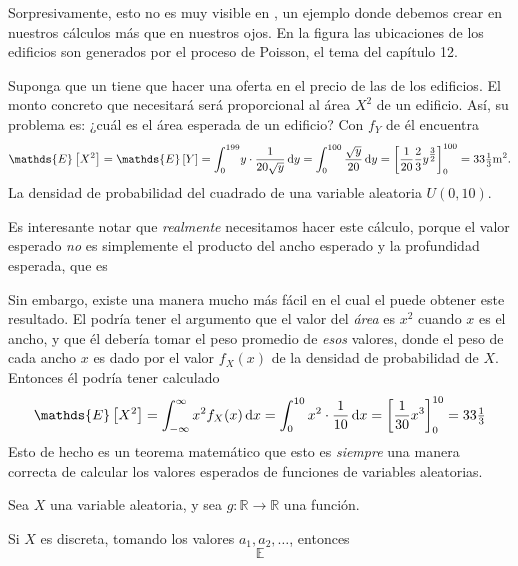 Sorpresivamente, esto no es muy visible en %
, un ejemplo donde debemos crear en nuestros cálculos más que en nuestros ojos. En la figura las ubicaciones de los edificios son generados por el proceso de Poisson, el tema del capítulo 12.

Suponga que un %
tiene que hacer una oferta en el precio de las %
de los edificios. El monto concreto que necesitará será proporcional al área $X^2$ de un edificio. Así, su problema es: ¿cuál es el área esperada de un edificio? Con $f_Y$ de %
él encuentra
\begin{equation*}
	\mathds{E}\left[X^2\right]=\mathds{E}\left[Y\right]=\int_{0}^{199}\! y\cdot\frac{1}{20\sqrt{y}}\dl y=\int_{0}^{100}\frac{\sqrt{y}}{20}\dl y={\left[\frac{1}{20}\frac{2}{3}y^{\tfrac{3}{2}}\right]}_{0}^{100}=33\tfrac{1}{3}\mathrm{m}^2.
\end{equation*}
La densidad de probabilidad del cuadrado de una variable aleatoria $U\left(0,10\right)$.

Es interesante notar que \emph{realmente} necesitamos hacer este cálculo, porque el valor esperado \emph{no} es simplemente el producto del ancho esperado y la profundidad esperada, que es %

Sin embargo, existe una manera mucho más fácil en el cual el %
puede obtener este resultado. El podría tener el argumento que el valor del \emph{área} es $x^2$ cuando $x$ es el ancho, y que él debería tomar el peso  promedio de \emph{esos} valores, donde el peso de cada ancho $x$ es dado por el valor $f_X(x)$ de la densidad de probabilidad de $X$. Entonces él podría tener calculado
\begin{equation*}
	\mathds{E}\left[X^2\right]=\int_{-\infty}^{\infty}x^2f_X(x)\dl x=\int_{0}^{10}x^2\cdot\frac{1}{10}\dl x={\left[\frac{1}{30}x^3\right]}_{0}^{10}=33\tfrac{1}{3}%
\end{equation*}
Esto de hecho es un teorema matemático que esto es \emph{siempre} una manera correcta de calcular los valores esperados de funciones de variables aleatorias.

\begin{theorem}
	Sea $X$ una variable aleatoria, y sea $g\colon\mathds{R}\rightarrow\mathds{R}$ una función.

	Si $X$ es discreta, tomando los valores $a_1, a_2, \ldots$, entonces
	\begin{equation*}
		\mathds{E}%
	\end{equation*}
\end{theorem}